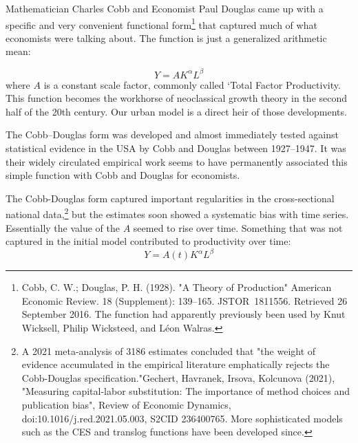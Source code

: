 Mathematician Charles Cobb and Economist Paul Douglas came up with a specific and very convenient functional form\footnote{Cobb, C. W.; Douglas, P. H. (1928). "A Theory of Production"  American Economic Review. 18 (Supplement): 139–165. JSTOR 1811556. Retrieved 26 September 2016. The function had apparently previously been used by Knut Wicksell, Philip Wicksteed, and L\'eon Walras.} that captured much of what economists were talking about. The function is just a generalized arithmetic mean:
 
 \[Y=AK^\alpha L^\beta\]
 where $A$ is a constant scale factor, commonly called `Total Factor Productivity. This function becomes the workhorse of neoclassical growth theory in the second half  of the 20th century. Our urban model is a direct heir of those developments.



The Cobb–Douglas form was developed and almost immediately tested against statistical evidence in the USA by Cobb and Douglas between 1927–1947. It was  their widely circulated empirical work seems to have permanently associated this simple function with Cobb and Douglas for economists.

The Cobb-Douglas form captured  important regularities in the cross-sectional national data,\footnote{ A 2021 meta-analysis of 3186 estimates concluded that "the weight of evidence accumulated in the empirical literature emphatically rejects the Cobb-Douglas specification."Gechert, Havranek, Irsova, Kolcunova (2021), "Measuring capital-labor substitution: The importance of method choices and publication bias", Review of Economic Dynamics, doi:10.1016/j.red.2021.05.003, S2CID 236400765. More sophisticated models  such as the CES and translog functions have been developed  since.} 
but the estimates soon showed a systematic bias with time series. Essentially the value of the $A$ seemed to rise over time. Something that was not captured in the initial model  contributed to productivity over time: 
 \[Y=A(t)K^\alpha L^\beta\]

